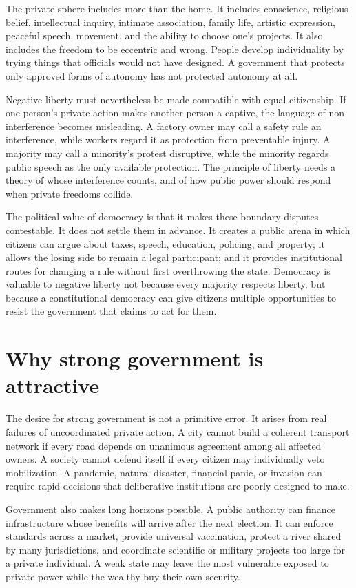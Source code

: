 ﻿\documentclass[12pt,a4paper]{book}
\begin{document}
The private sphere includes more than the home.  It includes conscience,
religious belief, intellectual inquiry, intimate association, family life,
artistic expression, peaceful speech, movement, and the ability to choose
one's projects.  It also includes the freedom to be eccentric and wrong.
People develop individuality by trying things that officials would not have
designed.  A government that protects only approved forms of autonomy has
not protected autonomy at all.

Negative liberty must nevertheless be made compatible with equal citizenship.
If one person's private action makes another person a captive, the language
of non-interference becomes misleading.  A factory owner may call a safety
rule an interference, while workers regard it as protection from preventable
injury.  A majority may call a minority's protest disruptive, while the
minority regards public speech as the only available protection.  The
principle of liberty needs a theory of whose interference counts, and of how
public power should respond when private freedoms collide.

The political value of democracy is that it makes these boundary disputes
contestable.  It does not settle them in advance.  It creates a public arena
in which citizens can argue about taxes, speech, education, policing, and
property; it allows the losing side to remain a legal participant; and it
provides institutional routes for changing a rule without first overthrowing
the state.  Democracy is valuable to negative liberty not because every
majority respects liberty, but because a constitutional democracy can give
citizens multiple opportunities to resist the government that claims to
act for them.

\section{Why strong government is attractive}

The desire for strong government is not a primitive error.  It arises from
real failures of uncoordinated private action.  A city cannot build a
coherent transport network if every road depends on unanimous agreement
among all affected owners.  A society cannot defend itself if every citizen
may individually veto mobilization.  A pandemic, natural disaster, financial
panic, or invasion can require rapid decisions that deliberative institutions
are poorly designed to make.

Government also makes long horizons possible.  A public authority can
finance infrastructure whose benefits will arrive after the next election.
It can enforce standards across a market, provide universal vaccination,
protect a river shared by many jurisdictions, and coordinate scientific or
military projects too large for a private individual.  A weak state may
leave the most vulnerable exposed to private power while the wealthy buy
their own security.
\end{document}
